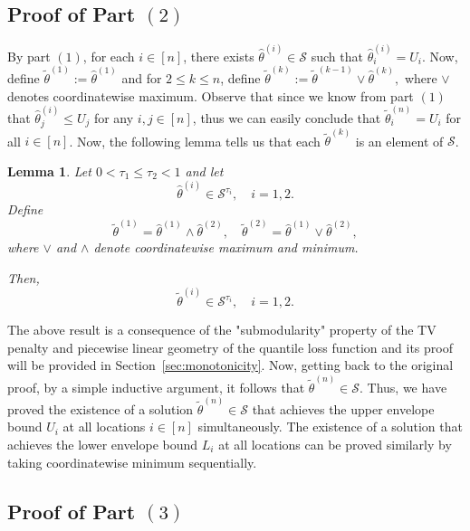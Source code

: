 \documentclass[11pt]{article}
\newcommand{\cS}{\mathcal{S}}
\theoremstyle{plain}
\newtheorem{lemma}[theorem]{Lemma}
\theoremstyle{definition}
\theoremstyle{remark}
\begin{document}
\subsection{Proof of Part $(2)$}\label{sec:minmax_2}
By part $(1)$, for each $i\in [n]$, there exists $\hat{\theta}^{(i)}\in \cS$ such that \(\hat{\theta}^{(i)}_i=U_i.\) Now, define $\tilde{\theta}^{(1)}:=\hat{\theta}^{(1)}$ and for $2\leq k \leq n$, define $\tilde{\theta}^{(k)}:=\tilde{\theta}^{(k-1)}\vee \hat{\theta}^{(k)},$ where $\vee$ denotes coordinatewise maximum. Observe that since we know from part $(1)$ that $\hat{\theta}^{(i)}_j\leq U_j$ for any $i,j\in [n]$, thus we can easily conclude that $\tilde{\theta}^{(n)}_i=U_i$ for all $i\in [n]$. Now, the following lemma tells us that each $\tilde{\theta}^{(k)}$ is an element of $\cS$.
\begin{lemma}\label{lemma:minmax_preserves_qtltvd_tvdonly}
     Let $0<\tau_1 \leq \tau_2<1$ and let
\[
\hat{\theta}^{(i)} \in \cS^{\tau_i},\quad i=1,2.
\]
Define
\[
\tilde{\theta}^{(1)} = \hat{\theta}^{(1)} \wedge \hat{\theta}^{(2)},\quad\tilde{\theta}^{(2)} = \hat{\theta}^{(1)} \vee \hat{\theta}^{(2)},
\]
where $\vee$ and $\wedge$ denote coordinatewise maximum and minimum.

Then,
\[
\tilde{\theta}^{(i)} \in \cS^{\tau_i},\quad i=1,2.
\]
\end{lemma}

The above result is a consequence of the "submodularity" property of the TV penalty and piecewise linear geometry of the quantile loss function and its proof will be provided in Section~\ref{sec:monotonicity}. Now, getting back to the original proof, by a simple inductive argument, it follows  that $\tilde{\theta}^{(n)}\in \cS$. Thus, we have proved the existence of a solution $\tilde{\theta}^{(n)}\in \cS$ that achieves the upper envelope bound $U_i$ at all locations $i\in[n]$ simultaneously. The existence of a solution that achieves the lower envelope bound $L_i$ at all locations can be proved similarly by taking coordinatewise minimum sequentially.

\subsection{Proof of Part $(3)$}\label{sec:minmax_3}
\end{document}
